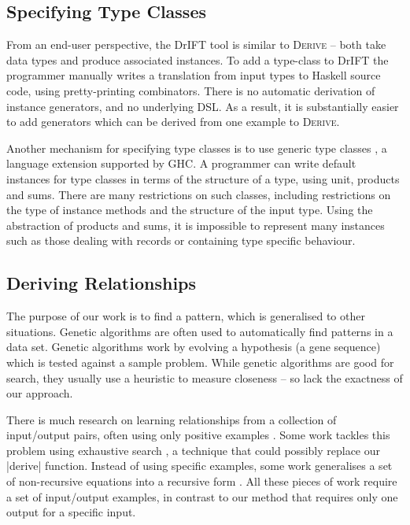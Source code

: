 \documentclass{llncs}
\newcommand{\derive}{\textsc{Derive}}
\begin{document}
\subsection{Specifying Type Classes}

From an end-user perspective, the DrIFT tool \cite{drift} is similar to \derive{} -- both take data types and produce associated instances. To add a type-class to DrIFT the programmer manually writes a translation from input types to Haskell source code, using pretty-printing combinators. There is no automatic derivation of instance generators, and no underlying DSL. As a result, it is substantially easier to add generators which can be derived from one example to \derive{}.

Another mechanism for specifying type classes is to use generic type classes \cite{hinze:derivable_type_classes}, a language extension supported by GHC. A programmer can write default instances for type classes in terms of the structure of a type, using unit, products and sums. There are many restrictions on such classes, including restrictions on the type of instance methods and the structure of the input type. Using the abstraction of products and sums, it is impossible to represent many instances such as those dealing with records or containing type specific behaviour.

\subsection{Deriving Relationships}

The purpose of our work is to find a pattern, which is generalised to other situations. Genetic algorithms \cite{genetic_algorithms} are often used to automatically find patterns in a data set. Genetic algorithms work by evolving a hypothesis (a gene sequence) which is tested against a sample problem. While genetic algorithms are good for search, they usually use a heuristic to measure closeness -- so lack the exactness of our approach.

There is much research on learning relationships from a collection of input/output pairs, often using only positive examples \cite{kitzelmann:data_driven_induction_ground}. Some work tackles this problem using exhaustive search \cite{katayama:exhaustive_generation}, a technique that could possibly replace our |derive| function. Instead of using specific examples, some work generalises a set of non-recursive equations into a recursive form \cite{kitzelmann:inductive_synthesis,kitzelmann:data_driven_induction}. All these pieces of work require a set of input/output examples, in contrast to our method that requires only one output for a specific input.
\end{document}
